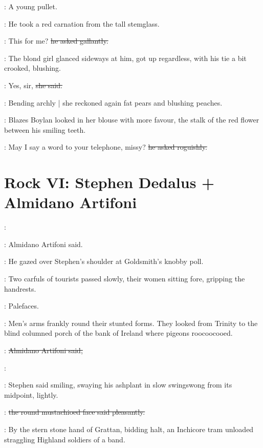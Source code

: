 \boylanint:
A young pullet.

:
He took a red carnation from the tall stemglass.

\boylan:
This for me?
\sout{he asked gallantly.}

:
The blond girl glanced sideways at him,
got up regardless,
with his tie a bit crooked,
blushing.

\blondgirl:
Yes, sir,
\sout{she said.}

:
Bending archly |
she reckoned again fat pears and blushing peaches.

:
Blazes Boylan looked in her blouse with more favour,
the stalk of the red flower between his smiling teeth.

\boylan:
May I say a word to your telephone, missy?
\sout{he asked roguishly.}


\section*{Rock VI: Stephen Dedalus + Almidano Artifoni}


\artifoni:

:
Almidano Artifoni said.

:
He gazed over Stephen's shoulder at Goldsmith's knobby poll.

:
Two carfuls of tourists passed slowly,
their women sitting fore,
gripping the handrests.

\StephenInt:
Palefaces.

:
Men's arms frankly round their stunted forms.
They looked from Trinity
to the blind columned porch of the bank of Ireland
where pigeons roocoocooed.

\artifoni:
\sout{Almidano Artifoni said,}

\Stephen:

:
Stephen said smiling,
swaying his ashplant in slow swingswong from its midpoint,
lightly.

\artifoni:
\sout{the round mustachioed face said pleasantly.}

:
By the stern stone hand of Grattan,
bidding halt,
an Inchicore tram unloaded straggling Highland soldiers of a band.

